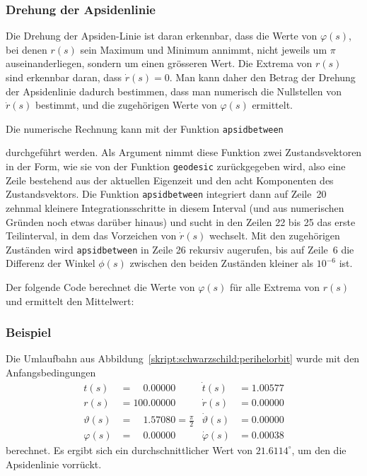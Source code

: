 \subsubsection{Drehung der Apsidenlinie}
Die Drehung der Apsiden-Linie ist daran erkennbar, dass die Werte von
$\varphi(s)$, bei denen $r(s)$ sein Maximum und Minimum annimmt,
nicht jeweils um $\pi$ auseinanderliegen, sondern um einen grösseren
Wert.
Die Extrema von $r(s)$ sind erkennbar daran, dass $\dot r(s)=0$.
Man kann daher den Betrag der Drehung der Apsidenlinie dadurch
bestimmen, dass man numerisch die Nullstellen von $\dot r(s)$
bestimmt, und die zugehörigen Werte von $\varphi(s)$ ermittelt.

Die numerische Rechnung kann mit der Funktion \texttt{apsidbetween}

durchgeführt werden.
Als Argument nimmt diese Funktion zwei Zustandsvektoren in der Form,
wie sie von der Funktion \texttt{geodesic}
zurückgegeben wird, also eine Zeile bestehend aus der aktuellen
Eigenzeit und den acht Komponenten des Zustandsvektors.
Die Funktion \texttt{apsidbetween} integriert dann auf Zeile~20
zehnmal kleinere Integrationsschritte in diesem Interval (und aus numerischen
Gründen noch etwas darüber hinaus) und sucht in den Zeilen 22 bis 25
das
erste Teilinterval, in dem das Vorzeichen von $\dot r(s)$ wechselt.
Mit den zugehörigen Zuständen wird \texttt{apsidbetween}
in Zeile 26
rekursiv augerufen, bis auf Zeile~6 die Differenz der Winkel $\phi(s)$ zwischen
den beiden Zuständen kleiner als $10^{-6}$ ist.

Der folgende Code berechnet die Werte von $\varphi(s)$ für alle
Extrema von $r(s)$ und ermittelt den Mittelwert:


\subsubsection{Beispiel}
Die Umlaufbahn aus Abbildung~\ref{skript:schwarzschild:perihelorbit}
wurde mit den Anfangsbedingungen
\begin{equation}
\begin{aligned}
t(s)        &=\phantom{00}0.00000                    &\dot t(s)         &= 1.00577\\
r(s)        &=          100.00000                    &\dot r(s)         &= 0.00000\\
\vartheta(s)&=\phantom{00}1.57080=\textstyle\frac\pi2&\dot \vartheta(s) &= 0.00000\\
\varphi(s)  &=\phantom{00}0.00000                    &\dot \varphi(s)   &= 0.00038
\end{aligned}
\label{skript:schwarzschild:anfangsbedingung:normal}
\end{equation}
berechnet.
Es ergibt sich ein durchschnittlicher Wert von $21.6114^\circ$, um den die
Apsidenlinie vorrückt.

